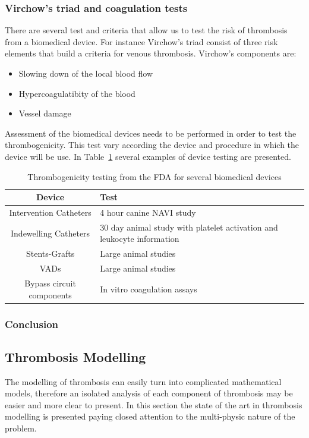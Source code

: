 \documentclass[%
 nofootinbib,
 amsmath,amssymb,
 aps,
 pra,
]{revtex4-1}
\begin{document}
\subsubsection{Virchow's triad and coagulation tests}
There are several test and criteria that allow us to test the risk of thrombosis from a biomedical device. For instance Virchow's triad consist of three risk elements that build a criteria for venous thrombosis.
Virchow's components are: 
\begin{itemize}
\item Slowing down of the local blood flow
\item Hypercoagulatibity of the blood
\item Vessel damage
\end{itemize}
Assessment of the biomedical devices needs to be performed in order to test the thrombogenicity. This test vary according the device and procedure in which the device will be use. In Table~\ref{tab:Thrombogenicity} several examples of device testing are presented.
\begin{table}[h]
\begin{tabular}{c p{4.5cm}}
\hline
\textbf{Device} &  \textbf{Test}\\
\hline
Intervention Catheters & 4 hour canine NAVI study\\
Indewelling Catheters & 30 day animal study with platelet activation and leukocyte information\\
Stents-Grafts & Large animal studies\\
VADs & Large animal studies\\
Bypass circuit components & In vitro coagulation assays \\
\hline
\end{tabular}
\caption{\label{tab:Thrombogenicity} Thrombogenicity testing from the FDA for several biomedical devices}
\end{table} 
\subsubsection{Conclusion}
\subsection{\label{sec:mechanical}Thrombosis Modelling}
The modelling of thrombosis can easily turn into complicated mathematical models, therefore an isolated analysis of each component of thrombosis may be easier and more clear to present. In this section the state of the art in thrombosis modelling is presented paying closed attention to the multi-physic nature of the problem.
\end{document}
